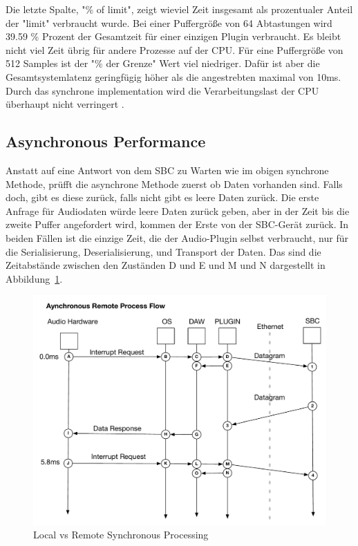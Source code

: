 Die letzte Spalte, "\% of limit", zeigt wieviel Zeit insgesamt als prozentualer Anteil der "limit" verbraucht wurde. Bei einer Puffergröße von 64 Abtastungen wird 39.59 \% Prozent der Gesamtzeit für einer einzigen Plugin verbraucht. Es bleibt nicht viel Zeit übrig für andere Prozesse auf der CPU. Für eine Puffergröße von 512 Samples ist der "\% der Grenze" Wert viel niedriger. Dafür ist aber die Gesamtsystemlatenz geringfügig höher als die angestrebten maximal von 10ms. Durch das synchrone implementation wird die Verarbeitungslast der CPU überhaupt nicht verringert .


\subsection{Asynchronous Performance}

Anstatt auf eine Antwort von dem SBC zu Warten wie im obigen synchrone Methode, prüfft die asynchrone Methode zuerst ob Daten vorhanden sind. Falls doch, gibt es diese zurück, falls nicht gibt es leere Daten zurück. Die erste Anfrage für Audiodaten würde leere Daten zurück geben, aber in der Zeit bis die zweite Puffer angefordert wird, kommen der Erste von der SBC-Gerät zurück. In beiden Fällen ist die einzige Zeit, die der Audio-Plugin selbst verbraucht, nur für die Serialisierung, Deserialisierung, und Transport der Daten. Das sind die Zeitabstände zwischen den Zuständen D und E und M und N dargestellt in Abbildung~\ref{fig:async_remote}.

\begin{figure}[H]
    \centering
    \includegraphics[width=\textwidth]{assets/conclusion/async_flow.pdf}
    \caption{Local vs Remote Synchronous Processing}
    \label{fig:async_remote}
\end{figure}

